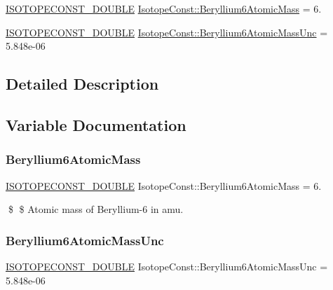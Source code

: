 \begin{DoxyCompactItemize}
\item 
\mbox{\hyperlink{group___isotope_const-_macros_ga8f45a7272ce02c0b4c65c44636ed719a}{I\+S\+O\+T\+O\+P\+E\+C\+O\+N\+S\+T\+\_\+\+D\+O\+U\+B\+LE}} \mbox{\hyperlink{group___isotope_const-_beryllium-_be6_ga5d32ff9c4688cf90e851deb4915db59f}{Isotope\+Const\+::\+Beryllium6\+Atomic\+Mass}} = 6.
\item 
\mbox{\hyperlink{group___isotope_const-_macros_ga8f45a7272ce02c0b4c65c44636ed719a}{I\+S\+O\+T\+O\+P\+E\+C\+O\+N\+S\+T\+\_\+\+D\+O\+U\+B\+LE}} \mbox{\hyperlink{group___isotope_const-_beryllium-_be6_gae1ddf2139998ce6a1b8a340ca8758bc7}{Isotope\+Const\+::\+Beryllium6\+Atomic\+Mass\+Unc}} = 5.\+848e-\/06
\end{DoxyCompactItemize}


\subsection{Detailed Description}


\subsection{Variable Documentation}
\mbox{\label{group___isotope_const-_beryllium-_be6_ga5d32ff9c4688cf90e851deb4915db59f}} 
\subsubsection{\texorpdfstring{Beryllium6\+Atomic\+Mass}{Beryllium6AtomicMass}}
{\footnotesize\ttfamily \mbox{\hyperlink{group___isotope_const-_macros_ga8f45a7272ce02c0b4c65c44636ed719a}{I\+S\+O\+T\+O\+P\+E\+C\+O\+N\+S\+T\+\_\+\+D\+O\+U\+B\+LE}} Isotope\+Const\+::\+Beryllium6\+Atomic\+Mass = 6.}

\$ \$ Atomic mass of Beryllium-\/6 in amu. \mbox{\label{group___isotope_const-_beryllium-_be6_gae1ddf2139998ce6a1b8a340ca8758bc7}} 
\subsubsection{\texorpdfstring{Beryllium6\+Atomic\+Mass\+Unc}{Beryllium6AtomicMassUnc}}
{\footnotesize\ttfamily \mbox{\hyperlink{group___isotope_const-_macros_ga8f45a7272ce02c0b4c65c44636ed719a}{I\+S\+O\+T\+O\+P\+E\+C\+O\+N\+S\+T\+\_\+\+D\+O\+U\+B\+LE}} Isotope\+Const\+::\+Beryllium6\+Atomic\+Mass\+Unc = 5.\+848e-\/06}

